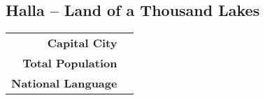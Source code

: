 \subsection{Halla -- Land of a Thousand Lakes}
\begin{tabular}{r | l}
    \textbf{Capital City} & \\
    \textbf{Total Population} & \\
    \textbf{National Language}
\end{tabular}
